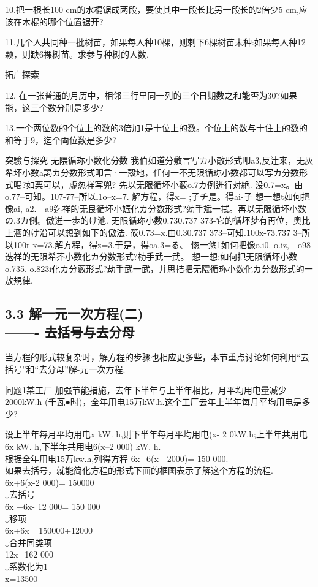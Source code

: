 \documentclass{article}
\begin{document}
\begin{article}
\begin{exercise}
10.把一根长100 cm的水棍锯成两段，要使其中一段长比另一段长的2倍少5 cm,应该在木棍的哪个位置锯开?

11.几个人共同种一批树苗，如果每人种10棵，则刺下6棵树苗未种:如果每人种12颗，则缺6裸树苗。求参与种树的人数.
\end{exercise}

拓广探索

12. 在一张普通的月历中，相邻三行里同一列的三个日期数之和能否为30?如果能，这三个数分別是多少?

13.一个两位数的个位上的数的3倍加1是十位上的数。个位上的数与十住上的数的
和等于9，迄个両位数是多少?

突驗与探究
无隈循珎小数化分数
我伯如道分敷言写カ小敵形式叩a3,反辻来，无灰希坏小数a謁カ分数形式叩言·一殼地，任何一不无限循珎小数都可以写カ分数形式喝?如栗可以，虚怱祥写兜?
先以无限循坏小薮o.7カ例迸行対絶.
没0.7=x。由o.77--可知。107-77--所以l1o--x=7. 解方程，得x= ;子チ是。得ai-子
想一想t如何把像ai, a2. - a9迄祥的无艮循坏小娠化カ分数形式?効手斌一拭。再以无限循坏小数の.3カ側。傲迸一歩的け池.
无限循珎小数0.730.737 373-它的循坏梦有再位，奥比上涵的け沿可以想到如下的傲法.
筱0.73=x.由0.30.737 373--可知.100x-73.737 3--所以100r x=73.解方程，得z=3.于是，得oa.3=る、
愡一悠1如何把像o.i0. o.iz, - o98迭祥的无限希芥小数化カ分数形式?朸手武一武。
想一想:如何把无限循坏小数o.735. o.823i化カ分藪形式?劫手武一武，并思拮把无隈循珎小数化カ分数形式的一敖規律.

\subsection*{3.3 解一元一次方程(二)\\\indent \indent \indent -------
去括号与去分母}

当方程的形式较复杂时，解方程的步骤也相应更多些，本节重点讨论如何利用“去括号”和“去分母”解-元一次方程.
\begin{example}

问题1某工厂 加强节能措施，去年下半年与上半年相比，月平均用电量减少2000kW.h (千瓦●时)，全年用电15万kW.h.这个工厂去年上半年每月平均用电是多少?

设上半年每月平均用电x kW. h,则下半年每月平均用电(x- 2 0kW.h;上半年共用电6x kW. h,下半年共用电6(x--2 000) kW. h.
\\根据全年用电15万kw.h,列得方程
6x+6(x - 2000)= 150 000.\\如果去括号，就能简化方程的形式下面的框图表示了解这个方程的流程.\\
6x+6(x-2 000)= 150000\\
↓去括号\\
6x +6x- 12 000= 150 000\\
↓移项\\
6x+6x= 150000+12000\\
↓合并同类项\\12x=162 000\\
↓系数化为1\\x=13500\\


\end{example}
\end{article}
\end{document}
